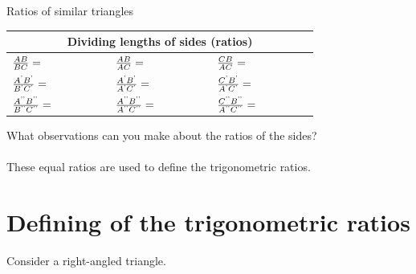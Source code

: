 \begin{Investigation}{Ratios of similar triangles}
\begin{table}[H]
\begin{center}
\noindent

\begin{tabular}{|l|l|l|}\hline
\multicolumn{3}{|c|}{Dividing lengths of sides (ratios)}
\\ \hline
$\frac{AB}{BC}=\phantom{\rule{42.67912pt}{0ex}}$
&
$\frac{AB}{AC}=\phantom{\rule{42.67912pt}{0ex}}$
&
$\frac{CB}{AC}=\phantom{\rule{42.67912pt}{0ex}}$
\\ \hline
$\frac{{A}^{\text{'}}{B}^{\text{'}}}{{B}^{\text{'}}{C}^{\text{'}}}=\phantom{\rule{42.67912pt}{0ex}}$
&
$\frac{{A}^{\text{'}}{B}^{\text{'}}}{{A}^{\text{'}}{C}^{\text{'}}}=\phantom{\rule{42.67912pt}{0ex}}$
&
$\frac{{C}^{\text{'}}{B}^{\text{'}}}{{A}^{\text{'}}{C}^{\text{'}}}=\phantom{\rule{42.67912pt}{0ex}}$
\\ \hline
$\frac{{A}^{\text{'}\text{'}}{B}^{\text{'}\text{'}}}{{B}^{\text{'}\text{'}}{C}^{\text{'}\text{'}}}=\phantom{\rule{42.67912pt}{0ex}}$
&
$\frac{{A}^{\text{'}\text{'}}{B}^{\text{'}\text{'}}}{{A}^{\text{'}\text{'}}{C}^{\text{'}\text{'}}}=\phantom{\rule{42.67912pt}{0ex}}$
&
$\frac{{C}^{\text{'}\text{'}}{B}^{\text{'}\text{'}}}{{A}^{\text{'}\text{'}}{C}^{\text{'}\text{'}}}=\phantom{\rule{42.67912pt}{0ex}}$
\\ \hline
\end{tabular}
\end{center}
\end{table}
\par
What observations can you make about the ratios of the sides?\\
\\
These equal ratios are used to define the trigonometric ratios.\par 
\end{Investigation}


    

\section{Defining of the trigonometric ratios}
Consider a right-angled triangle.\par 

